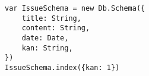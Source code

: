 

\lstset{language=C}

\begin{lstlisting}[frame=single]
var IssueSchema = new Db.Schema({
	title: String,
	content: String,
	date: Date,
	kan: String,
})
IssueSchema.index({kan: 1})
\end{lstlisting}